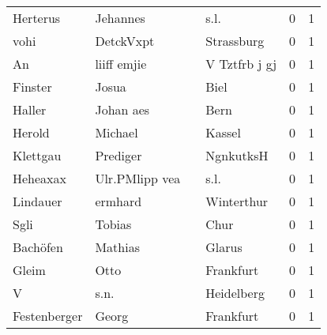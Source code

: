 \begin{center}
\begin{tiny}
\begin{longtabu}{llllrr}
                 Herterus &                           Jehannes &             &                                        s.l. &          0 &         1 \\
                     vohi &                          DetckVxpt &             &                                  Strassburg &          0 &         1 \\
                       An &                        liiff emjie &             &                               V Tztfrb j gj &          0 &         1 \\
                  Finster &                              Josua &             &                                        Biel &          0 &         1 \\
                   Haller &                          Johan aes &             &                                        Bern &          0 &         1 \\
                   Herold &                            Michael &             &                                      Kassel &          0 &         1 \\
                 Klettgau &                           Prediger &             &                                   NgnkutksH &          0 &         1 \\
                 Heheaxax &                     Ulr.PMlipp vea &             &                                        s.l. &          0 &         1 \\
                 Lindauer &                            ermhard &             &                                  Winterthur &          0 &         1 \\
                     Sgli &                             Tobias &             &                                        Chur &          0 &         1 \\
                 Bachöfen &                            Mathias &             &                                      Glarus &          0 &         1 \\
                    Gleim &                               Otto &             &                                   Frankfurt &          0 &         1 \\
                        V &                               s.n. &             &                                  Heidelberg &          0 &         1 \\
             Festenberger &                              Georg &             &                                   Frankfurt &          0 &         1 \\

\end{longtabu}
\end{tiny}
\end{center}
